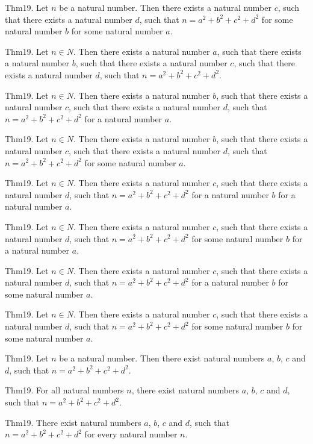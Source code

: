 \documentclass{article}
\begin{document}
Thm19. Let $n$ be a natural number. Then there exists a natural number $c$, such that there exists a natural number $d$, such that $n = a ^{ 2}+ b ^{ 2}+ c ^{ 2}+ d ^{ 2}$ for some natural number $b$ for some natural number $a$.

Thm19. Let $n \in N$. Then there exists a natural number $a$, such that there exists a natural number $b$, such that there exists a natural number $c$, such that there exists a natural number $d$, such that $n = a ^{ 2}+ b ^{ 2}+ c ^{ 2}+ d ^{ 2}$.

Thm19. Let $n \in N$. Then there exists a natural number $b$, such that there exists a natural number $c$, such that there exists a natural number $d$, such that $n = a ^{ 2}+ b ^{ 2}+ c ^{ 2}+ d ^{ 2}$ for a natural number $a$.

Thm19. Let $n \in N$. Then there exists a natural number $b$, such that there exists a natural number $c$, such that there exists a natural number $d$, such that $n = a ^{ 2}+ b ^{ 2}+ c ^{ 2}+ d ^{ 2}$ for some natural number $a$.

Thm19. Let $n \in N$. Then there exists a natural number $c$, such that there exists a natural number $d$, such that $n = a ^{ 2}+ b ^{ 2}+ c ^{ 2}+ d ^{ 2}$ for a natural number $b$ for a natural number $a$.

Thm19. Let $n \in N$. Then there exists a natural number $c$, such that there exists a natural number $d$, such that $n = a ^{ 2}+ b ^{ 2}+ c ^{ 2}+ d ^{ 2}$ for some natural number $b$ for a natural number $a$.

Thm19. Let $n \in N$. Then there exists a natural number $c$, such that there exists a natural number $d$, such that $n = a ^{ 2}+ b ^{ 2}+ c ^{ 2}+ d ^{ 2}$ for a natural number $b$ for some natural number $a$.

Thm19. Let $n \in N$. Then there exists a natural number $c$, such that there exists a natural number $d$, such that $n = a ^{ 2}+ b ^{ 2}+ c ^{ 2}+ d ^{ 2}$ for some natural number $b$ for some natural number $a$.

Thm19. Let $n$ be a natural number. Then there exist natural numbers $a$, $b$, $c$ and $d$, such that $n = a ^{ 2}+ b ^{ 2}+ c ^{ 2}+ d ^{ 2}$.

Thm19. For all natural numbers $n$, there exist natural numbers $a$, $b$, $c$ and $d$, such that $n = a ^{ 2}+ b ^{ 2}+ c ^{ 2}+ d ^{ 2}$.

Thm19. There exist natural numbers $a$, $b$, $c$ and $d$, such that $n = a ^{ 2}+ b ^{ 2}+ c ^{ 2}+ d ^{ 2}$ for every natural number $n$.
\end{document}
